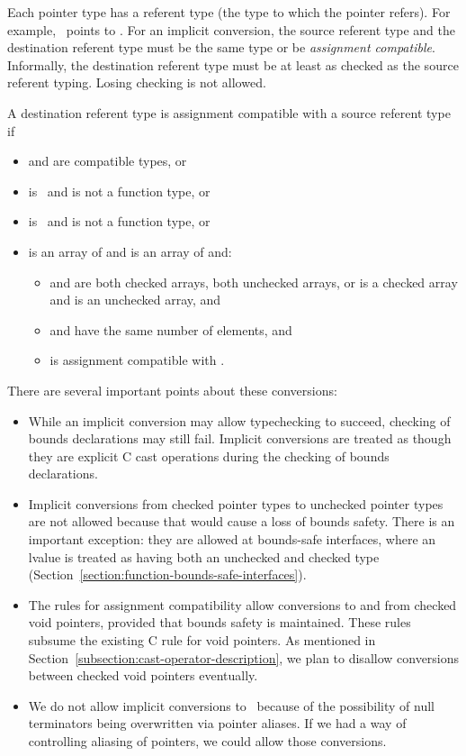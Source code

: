 Each pointer type has a referent type (the type to which the pointer refers).
For example, \arrayptrT\ points to .   For an implicit conversion, the
source referent type and the destination referent type must be the same type or
be {\em assignment compatible}.  Informally, the destination referent type must
be at least as checked as the source referent typing.  Losing checking is not allowed.

A destination referent type  is assignment compatible with a source referent
type  if
\begin{itemize}
\item {} and  are compatible types, or
\item {} is \void\ and  is not a function type, or
\item {} is \void\ and  is not a function type, or
\item {} is an array of  and  is an array of 
and:
\begin{itemize}
\item {} and  are both checked arrays, both unchecked arrays, or
 is a checked array and  is an unchecked array, and
\item {} and  have the same number of elements, and
\item {} is assignment compatible with .
\end{itemize}
\end{itemize}

There are several important points about these conversions:
\begin{itemize}
\item  While an implicit conversion may allow typechecking to succeed,
       checking of bounds declarations may still fail.  Implicit
       conversions are treated as though they are explicit C cast
       operations during the checking of bounds declarations.
\item  Implicit conversions from checked pointer types to
      unchecked pointer types are not allowed because that would cause a loss of bounds safety.
      There is an important exception: they are allowed at bounds-safe interfaces,
      where an lvalue is treated as having both an unchecked
      and checked type (Section~\ref{section:function-bounds-safe-interfaces}).
\item The rules for assignment compatibility allow conversions to and from checked void pointers,
      provided that bounds safety is maintained.  These rules subsume the existing C rule for
      void pointers.  As mentioned in Section~\ref{subsection:cast-operator-description}, we plan
      to disallow conversions between checked void pointers eventually.
\item We do not allow implicit conversions to \ntarrayptrT\ because of the possibility
      of null terminators being overwritten via pointer aliases.  If we had a way of controlling
      aliasing of pointers, we could allow those conversions.
\end{itemize}

